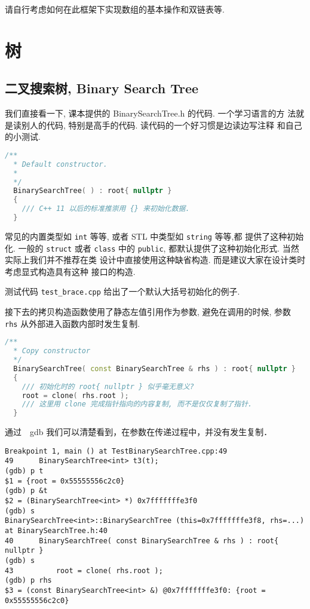 \documentclass[a4paper]{ctexart}
\theoremstyle{definition}
\theoremstyle{definition}
\begin{document}
请自行考虑如何在此框架下实现数组的基本操作和双链表等. 

\section{树}

\subsection{二叉搜索树, Binary Search Tree}

我们直接看一下, 课本提供的 BinarySearchTree.h 的代码. 一个学习语言的方
法就是读别人的代码, 特别是高手的代码. 读代码的一个好习惯是边读边写注释
和自己的小测试.

\begin{lstlisting}[language=C++]
  /** 
  * Default constructor. 
  * 
  */
  BinarySearchTree( ) : root{ nullptr } 
  {
    /// C++ 11 以后的标准推崇用 {} 来初始化数据.  
  }
\end{lstlisting}

常见的内置类型如 \verb|int| 等等, 或者 STL 中类型如 \verb|string| 等等,都
提供了这种初始化. 一般的 \verb|struct| 或者 \verb|class| 中的
\verb|public|, 都默认提供了这种初始化形式. 当然实际上我们并不推荐在类
设计中直接使用这种缺省构造. 而是建议大家在设计类时考虑显式构造具有这种
接口的构造. 

测试代码 \verb|test_brace.cpp| 给出了一个默认大括号初始化的例子.

接下去的拷贝构造函数使用了静态左值引用作为参数, 避免在调用的时候, 参数
\verb|rhs| 从外部进入函数内部时发生复制.

\begin{lstlisting}[language=C++]
  /**
  * Copy constructor
  */
  BinarySearchTree( const BinarySearchTree & rhs ) : root{ nullptr }
  {
    /// 初始化时的 root{ nullptr } 似乎毫无意义?
    root = clone( rhs.root );
    /// 这里用 clone 完成指针指向的内容复制, 而不是仅仅复制了指针.
  }
\end{lstlisting}

通过　gdb 我们可以清楚看到，在参数在传递过程中，并没有发生复制．

\begin{verbatim}
Breakpoint 1, main () at TestBinarySearchTree.cpp:49
49	    BinarySearchTree<int> t3(t);
(gdb) p t
$1 = {root = 0x55555556c2c0}
(gdb) p &t
$2 = (BinarySearchTree<int> *) 0x7fffffffe3f0
(gdb) s
BinarySearchTree<int>::BinarySearchTree (this=0x7fffffffe3f8, rhs=...) 
at BinarySearchTree.h:40
40	    BinarySearchTree( const BinarySearchTree & rhs ) : root{ nullptr }
(gdb) s
43			root = clone( rhs.root );
(gdb) p rhs
$3 = (const BinarySearchTree<int> &) @0x7fffffffe3f0: {root = 0x55555556c2c0}
\end{verbatim}
\end{document}
